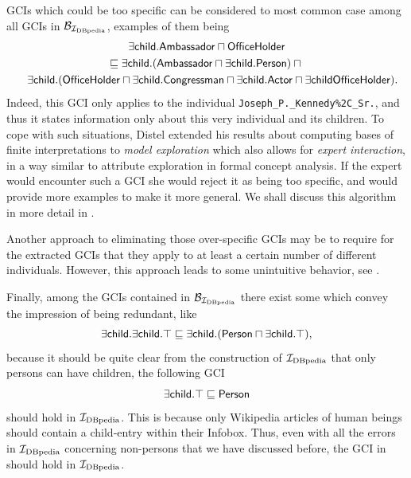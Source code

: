 GCIs which could be too specific can be considered to most common case among all GCIs in
$\mathcal{B}_{{\mathcal{I}_{\text{DBpedia}}}}$, examples of them being
\begin{gather*}
  \sf \exists child. Ambassador \sqcap OfficeHolder \\
  \sqsubseteq \sf \exists child. (Ambassador \sqcap \exists child. Person) \sqcap {}\\
  \phantom{\sqsubseteq{}} \sf\exists child. (OfficeHolder \sqcap \exists child.
  Congressman \sqcap \exists child. Actor \sqcap \exists child OfficeHolder).
\end{gather*}
Indeed, this GCI only applies to the individual \texttt{Joseph\_P.\_Kennedy\%2C\_Sr.}, and
thus it states information only about this very individual and its children.  To cope with
such situations, Distel extended his results about computing bases of finite
interpretations to \emph{model exploration} which also allows for \emph{expert
  interaction}, in a way similar to attribute exploration in formal concept analysis.  If
the expert would encounter such a GCI she would reject it as being too specific, and would
provide more examples to make it more general.  We shall discuss this algorithm in more
detail in .

Another approach to eliminating those over-specific GCIs may be to require for the
extracted GCIs that they apply to at least a certain number of different individuals.
However, this approach leads to some unintuitive behavior, see .

Finally, among the GCIs contained in $\mathcal{B}_{\mathcal{I}_{\text{DBpedia}}}$ there exist some which convey
the impression of being redundant, like
\begin{equation*}
  \sf \exists child. \exists child. \top \sqsubseteq \exists child. (Person \sqcap \exists child. \top),
\end{equation*}
because it should be quite clear from the construction of ${\mathcal{I}_{\text{DBpedia}}}$ that only persons
can have children, \ie the following GCI
\begin{equation}
  \label{eq:23}
  \sf \exists child. \top \sqsubseteq Person
\end{equation}
should hold in ${\mathcal{I}_{\text{DBpedia}}}$.  This is because only Wikipedia articles of human beings
should contain a child-entry within their Infobox.  Thus, even with all the errors in
${\mathcal{I}_{\text{DBpedia}}}$ concerning non-persons that we have discussed before, the GCI in 
should hold in ${\mathcal{I}_{\text{DBpedia}}}$.

